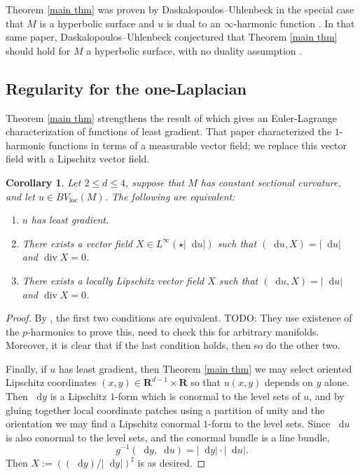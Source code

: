 \documentclass[reqno,10pt]{amsart}
\newcommand{\RR}{\mathbf{R}}
\newcommand*\dif{\mathop{}\!\mathrm{d}}
\DeclareMathOperator{\Div}{div}
\newcommand{\loc}{\mathrm{loc}}
\newtheorem{corollary}[theorem]{Corollary}
\theoremstyle{definition}
\numberwithin{equation}{section}
\begin{document}
Theorem \ref{main thm} was proven by Daskalopoulos--Uhlenbeck in the special case that $M$ is a hyperbolic surface and $u$ is dual to an $\infty$-harmonic function \cite[Theorem 5.2, Theorem 6.10]{daskalopoulos2020transverse}.
In that same paper, Daskalopoulos--Uhlenbeck conjectured that Theorem \ref{main thm} should hold for $M$ a hyperbolic surface, with no duality assumption \cite[Problem 9.4, Conjecture 9.5]{daskalopoulos2020transverse}.

\subsection{Regularity for the one-Laplacian}
Theorem \ref{main thm} strengthens the result of \cite{Mazon14} which gives an Euler-Lagrange characterization of functions of least gradient.
That paper characterized the $1$-harmonic functions in terms of a measurable vector field; we replace this vector field with a Lipschitz vector field.

\begin{corollary}
Let $2 \leq d \leq 4$, suppose that $M$ has constant sectional curvature, and let $u \in BV_\loc(M)$. The following are equivalent:
\begin{enumerate}
\item $u$ has least gradient.
\item There exists a vector field $X \in L^\infty(\star |\dif u|)$ such that $(\dif u, X) = |\dif u|$ and $\Div X = 0$.
\item There exists a locally Lipschitz vector field $X$ such that $(\dif u, X) = |\dif u|$ and $\Div X = 0$.
\end{enumerate}
\end{corollary}
\begin{proof}
By \cite{Mazon14}, the first two conditions are equivalent. TODO: They use existence of the $p$-harmonics to prove this, need to check this for arbitrary manifolds.
Moreover, it is clear that if the last condition holds, then so do the other two.

Finally, if $u$ has least gradient, then Theorem \ref{main thm} we may select oriented Lipschitz coordinates $(x, y) \in \RR^{d - 1} \times \RR$ so that $u(x, y)$ depends on $y$ alone.
Then $\dif y$ is a Lipschitz $1$-form which is conormal to the level sets of $u$, and by gluing together local coordinate patches using a partition of unity and the orientation we may find a Lipschitz conormal $1$-form to the level sets.
Since $\dif u$ is also conormal to the level sets, and the conormal bundle is a line bundle,
$$g^{-1}(\dif y, \dif u) = |\dif y| \cdot |\dif u|.$$
Then $X := ((\dif y)/|\dif y|)^\sharp$ is as desired.
\end{proof}
\end{document}
